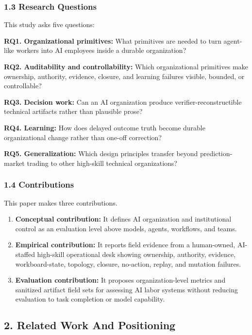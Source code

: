 \documentclass[
]{article}
\providecommand{\tightlist}{%
  \setlength{\itemsep}{0pt}\setlength{\parskip}{0pt}}
\begin{document}
\subsubsection{1.3 Research Questions}\label{research-questions}

This study asks five questions:

\textbf{RQ1. Organizational primitives:} What primitives are needed to turn agent-like workers into AI employees inside a durable organization?

\textbf{RQ2. Auditability and controllability:} Which organizational primitives make ownership, authority, evidence, closure, and learning failures visible, bounded, or controllable?

\textbf{RQ3. Decision work:} Can an AI organization produce verifier-reconstructible technical artifacts rather than plausible prose?

\textbf{RQ4. Learning:} How does delayed outcome truth become durable organizational change rather than one-off correction?

\textbf{RQ5. Generalization:} Which design principles transfer beyond prediction-market trading to other high-skill technical organizations?

\subsubsection{1.4 Contributions}\label{contributions}

This paper makes three contributions.

\begin{enumerate}
\def\labelenumi{\arabic{enumi}.}
\tightlist
\item
  \textbf{Conceptual contribution:} It defines AI organization and institutional control as an evaluation level above models, agents, workflows, and teams.
\item
  \textbf{Empirical contribution:} It reports field evidence from a human-owned, AI-staffed high-skill operational desk showing ownership, authority, evidence, workboard-state, topology, closure, no-action, replay, and mutation failures.
\item
  \textbf{Evaluation contribution:} It proposes organization-level metrics and sanitized artifact field sets for assessing AI labor systems without reducing evaluation to task completion or model capability.
\end{enumerate}

\subsection{2. Related Work And Positioning}\label{related-work-and-positioning}
\end{document}
